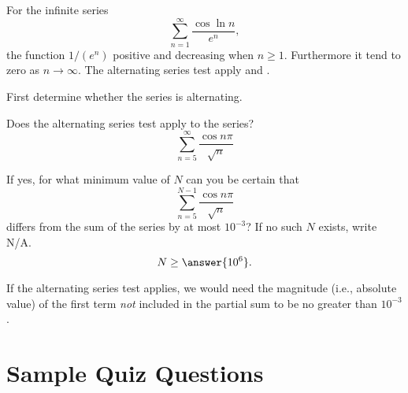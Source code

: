\documentclass{ximera}
\begin{document}
\begin{exercise}
For the infinite series
\[ \sum_{n=1}^\infty \frac{\cos \ln n}{ e^n}, \]
the function $1/(e^n)$  positive and  decreasing when $n \geq 1$. Furthermore it  tend to zero as $n \rightarrow \infty$. The alternating series test  apply and .
\begin{hint}
First determine whether the series is alternating.
\end{hint}
\end{exercise}


\begin{exercise}
Does the alternating series test apply to the series?
\[ \sum_{n=5}^\infty \frac{\cos n \pi}{ \sqrt{n}} \]
\begin{multipleChoice}
\end{multipleChoice}
If yes, for what minimum value of $N$ can you be certain that
\[ \sum_{n=5}^{N-1} \frac{\cos n \pi}{\sqrt{n}} \]
differs from the sum of the series by at most $10^{-3}$? If no such $N$ exists, write N/A.
\[ N \geq \answer{10^{6}}. \]
\begin{hint}
If the alternating series test applies, we would need the magnitude (i.e., absolute value) of the first term \textit{not} included in the partial sum to be no greater than $10^{-3}$.
\end{hint}
\end{exercise}




\section*{Sample Quiz Questions}
\end{document}
